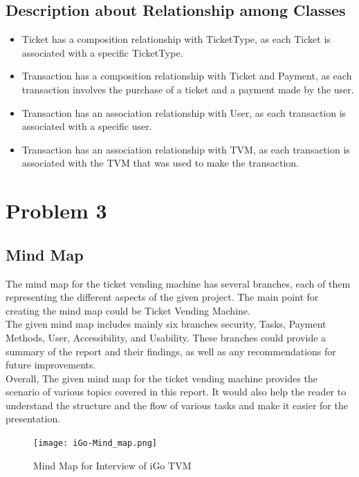 \documentclass[a4paper, 11pt]{report}
\begin{document}
\section{Description about Relationship among Classes}
\begin{itemize}
\item Ticket has a composition relationship with TicketType, as each Ticket is associated with a specific TicketType.
\item Transaction has a composition relationship with Ticket and Payment, as each transaction involves the purchase of a ticket and a payment made by the user.
\item Transaction has an association relationship with User, as each transaction is associated with a specific user.
\item Transaction has an association relationship with TVM, as each transaction is associated with the TVM that was used to make the transaction.
 \end{itemize}


\chapter{Problem 3}
\section{Mind Map}

The mind map for the ticket vending machine has several branches, each of them representing the different aspects of the given project. The main point for creating the mind map could be Ticket Vending Machine. \\
The given mind map includes mainly six branches security, Tasks, Payment Methods, User, Accessibility, and Usability. These branches could provide a summary of the report and their findings, as well as any recommendations for future improvements. \\
Overall, The given mind map for the ticket vending machine provides the scenario of various topics covered in this report. It would also help the reader to understand the structure and the flow of various tasks and make it easier for the presentation.\\


\begin{figure}[h]
    \centering
    \texttt{[image: iGo-Mind\_map.png]}
    \caption{Mind Map for Interview of iGo TVM}
    \label{fig:Mind Map for Interview for iGo TVM}
\end{figure}
\end{document}

